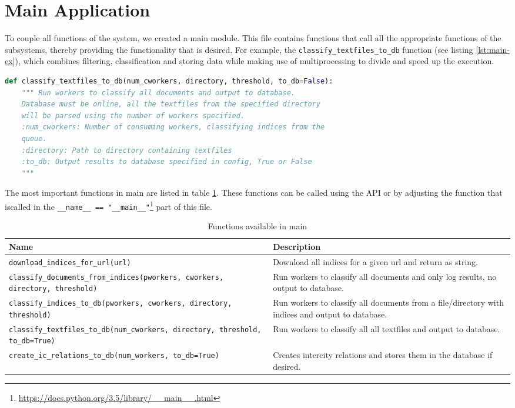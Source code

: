 \section{Main Application} \label{sec:main-app}
To couple all functions of the system, we created a main module. This file contains functions that call all the appropriate functions of the subsystems, thereby providing the functionality that is desired. For example, the \texttt{classify\_textfiles\_to\_db} function (see listing \ref{lst:main-ex}), which combines filtering, classification and storing data while making use of multiprocessing to divide and speed up the execution.

\begin{lstlisting}[language=Python, caption=Header of a function in main.py, label={lst:main-ex}]
def classify_textfiles_to_db(num_cworkers, directory, threshold, to_db=False):
    """ Run workers to classify all documents and output to database.
    Database must be online, all the textfiles from the specified directory
    will be parsed using the number of workers specified.
    :num_cworkers: Number of consuming workers, classifying indices from the
    queue.
    :directory: Path to directory containing textfiles
    :to_db: Output results to database specified in config, True or False
    """
\end{lstlisting}

The most important functions in main are listed in table \ref{tbl:main-functions}. These functions can be called using the API or by adjusting the function that iscalled in the \texttt{\_\_name\_\_ == "\_\_main\_\_"}\footnote{\url{https://docs.python.org/3.5/library/__main__.html}} part of this file.

\begin{table}[H]
\centering
\begin{tabular}{m{8cm} m{8cm}}
\textbf{Name}                     & \textbf{Description} \\\hline
\texttt{download\_indices\_for\_url(url)} & Download all indices for a given url and return as string. \\\hline

\texttt{classify\_documents\_from\_indices(pworkers, cworkers, directory, threshold)} & Run workers to classify all documents and only log results, no output to database.\\\hline

\texttt{classify\_indices\_to\_db(pworkers, cworkers, directory, threshold)} & Run workers to classify all documents from a file/directory with indices and output to database.\\\hline

\texttt{classify\_textfiles\_to\_db(num\_cworkers, directory, threshold, to\_db=True)} & Run workers to classify all all textfiles and output to database.\\\hline

\texttt{create\_ic\_relations\_to\_db(num\_workers, to\_db=True)} & Creates intercity relations and stores them in the database if desired. \\\hline 

\end{tabular}
\caption{Functions available in main}
\label{tbl:main-functions}
\end{table}